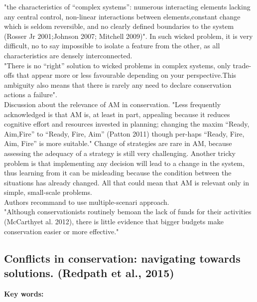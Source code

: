 \documentclass[12pt]{article}
\begin{document}
"the characteristics of “complex systems”: numerous interacting elements lacking any central control, non-linear interactions between elements,constant change which is seldom reversible, and no clearly defined boundaries to the system (Rosser Jr 2001;Johnson 2007; Mitchell 2009)". In such wicked problem, it is very difficult, no to say impossible to isolate a feature from the other, as all characteristics are densely interconnected.\\
"There is no “right” solution to wicked problems in complex systems, only trade-offs that appear more or less favourable depending on your perspective.This ambiguity also means that there is rarely any need to declare conservation actions a failure".\\
Discussion about the relevance of AM in conservation.
"Less frequently acknowledged is that AM is, at least in part, appealing because it reduces cognitive effort and resources invested in planning; changing the maxim “Ready, Aim,Fire” to “Ready, Fire, Aim” (Patton 2011) though per-haps “Ready, Fire, Aim, Fire” is more suitable." 
Change of strategies are rare in AM, because assessing the adequacy of a strategy is still very challenging.
Another tricky problem is that implementing any decision will lead to a change in the system, thus learning from it can be misleading because the condition between the situations has already changed.
All that could mean that AM is relevant only in simple, small-scale problems.\\
Authors recommand to use multiple-scenari approach.\\
"Although conservationists routinely bemoan the lack of funds for their activities (McCarthyet  al. 2012), there is little evidence that bigger budgets make conservation easier or more effective."

\subsection{Conflicts in conservation: navigating towards solutions. (Redpath et al., 2015)}
\textbf{Key words:}\\
\end{document}
